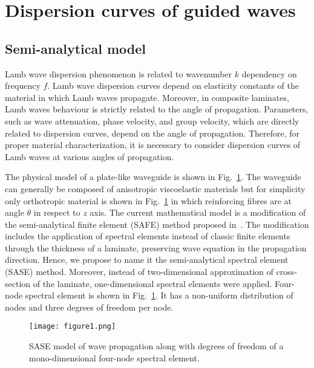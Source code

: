 	
	
\section{Dispersion curves of guided waves \label{sec:dispersion_curves}}
	
\subsection{Semi-analytical model}
	Lamb wave dispersion phenomenon is related to wavenumber  \(k\) dependency on 
	frequency \(f\). Lamb wave dispersion curves depend on elasticity constants of the 
	material in which Lamb waves propagate. Moreover, in composite laminates, Lamb 
	waves behaviour is strictly related to the angle of propagation. Parameters, such as 
	wave attenuation, phase velocity, and group velocity, which are directly related to 
	dispersion curves, depend on the angle of propagation. Therefore, for proper material 
	characterization, it is necessary to consider dispersion curves of Lamb waves at 
	various angles of propagation.
	
	The physical model of a plate-like waveguide is shown in 
	Fig.~\ref{fig:layered_composite_SASE}.  The waveguide can generally be composed 
	of anisotropic viscoelastic materials but for simplicity only orthotropic material is 
	shown in Fig.~\ref{fig:layered_composite_SASE} in which reinforcing fibres are at 
	angle \(\theta\) in respect to \(z\) axis. The current mathematical model is a 
	modification of the semi-analytical finite element (SAFE) method proposed 
	in~\cite{Bartoli2006}. The modification includes the application of spectral elements 
	instead of classic finite elements through the thickness of a laminate, preserving 
	wave equation in the propagation direction. Hence, we propose to name it the 
	semi-analytical spectral element (SASE) method. Moreover, instead of 
	two-dimensional approximation of cross-section of the laminate, one-dimensional 
	spectral elements were applied. Four-node spectral element is shown in 
	Fig.~\ref{fig:layered_composite_SASE}. It has a non-uniform distribution of nodes 
	and three degrees of freedom per node.
	
		
\begin{figure} [h!]
		\centering
	\texttt{[image: figure1.png]}
				
\caption{SASE model of wave propagation along with degrees of freedom of a mono-dimensional four-node spectral element.}

		\label{fig:layered_composite_SASE}
	\end{figure}
	
